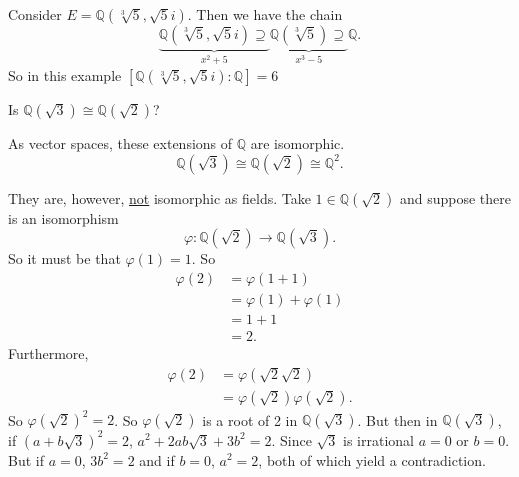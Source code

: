 \begin{example}
	Consider $E=\mathbb Q(\sqrt[3]{5},\sqrt 5i)$. Then we have the chain
	$$\underbrace{\mathbb Q(\sqrt[3]{5},\sqrt 5i)\supseteq}_{x^2+5} \underbrace{\mathbb Q(\sqrt[3]{5})\supseteq}_{x^3-5} \mathbb Q.$$
	So in this example $[\mathbb Q(\sqrt[3]{5},\sqrt 5i):\mathbb Q]=6$
\end{example}

\begin{example}
	Is $\mathbb Q(\sqrt 3)\cong\mathbb Q(\sqrt 2)$?
	\begin{solution}
		As vector spaces, these extensions of $\mathbb Q$ are isomorphic.
		$$\mathbb Q(\sqrt 3)\cong\mathbb Q(\sqrt 2)\cong\mathbb Q^2.$$

		They are, however, \underline{not} isomorphic as fields. Take $1\in\mathbb Q(\sqrt 2)$ and suppose there is an isomorphism
		$$\varphi\colon \mathbb Q(\sqrt 2)\to\mathbb Q(\sqrt 3).$$
		So it must be that $\varphi(1)=1$. So
		\begin{align*}
			\varphi(2)&=\varphi(1+1)\\
			&=\varphi(1)+\varphi(1)\\
			&=1+1\\
			&=2.
		\end{align*}
		Furthermore,
		\begin{align*}
			\varphi(2)&=\varphi(\sqrt 2\sqrt 2)\\
			&=\varphi(\sqrt 2)\varphi(\sqrt 2).
		\end{align*}
		So $\varphi(\sqrt 2)^2=2$. So $\varphi(\sqrt 2)$ is a root of 2 in $\mathbb Q(\sqrt 3)$. But then in $\mathbb Q(\sqrt 3)$, if $(a+b\sqrt 3)^2=2$, $a^2+2ab\sqrt 3+3b^2=2$. Since $\sqrt 3$ is irrational $a=0$ or $b=0$. But if $a=0$, $3b^2=2$ and if $b=0$, $a^2=2$, both of which yield a contradiction.
	\end{solution}
\end{example}